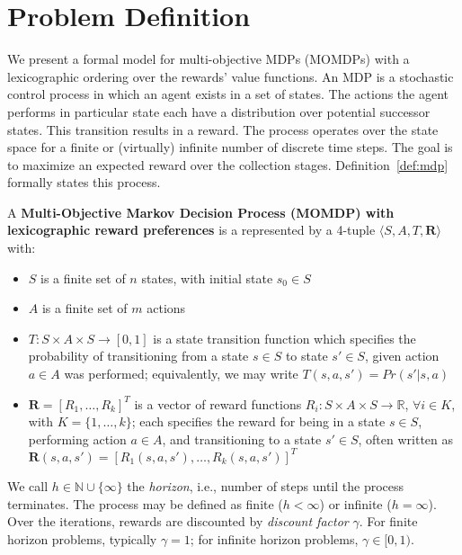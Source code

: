 \section{Problem Definition}
\label{sec:problem_definition}

We present a formal model for multi-objective MDPs (MOMDPs) with a lexicographic ordering over the rewards' value functions. An MDP is a stochastic control process in which an agent exists in a set of states. The actions the agent performs in particular state each have a distribution over potential successor states. This transition results in a reward. The process operates over the state space for a finite or (virtually) infinite number of discrete time steps. The goal is to maximize an expected reward over the collection stages. Definition~\ref{def:mdp} formally states this process.
\begin{definition}
    \label{def:mdp}
    A \textbf{Multi-Objective Markov Decision Process (MOMDP) with lexicographic reward preferences} is a represented by a 4-tuple $\langle S, A, T, \mathbf{R} \rangle$ with:
    \begin{itemize}
        \item $S$ is a finite set of $n$ states, with initial state $s_0 \in S$
        \item $A$ is a finite set of $m$ actions
        \item $T : S \times A \times S \rightarrow [0, 1]$ is a state transition function which specifies the probability of transitioning from a state $s \in S$ to state $s' \in S$, given action $a \in A$ was performed; equivalently, we may write $T(s, a, s') = Pr(s' | s, a)$
        \item $\mathbf{R} = [R_1, \ldots, R_k ]^T$ is a vector of reward functions $R_i : S \times A \times S \rightarrow \mathbb{R}$, $\forall i \in K$, with $K = \{1, \ldots, k\}$; each specifies the reward for being in a state $s \in S$, performing action $a \in A$, and transitioning to a state $s' \in S$, often written as $\mathbf{R}(s, a, s') = [R_1(s, a, s'), \ldots, R_k(s, a, s')]^T$
    \end{itemize}
\end{definition}

We call $h \in \mathbb{N} \cup \{ \infty \}$ the \emph{horizon}, i.e., number of steps until the process terminates. The process may be defined as finite ($h < \infty$) or infinite ($h = \infty$). Over the iterations, rewards are discounted by \emph{discount factor} $\gamma$. For finite horizon problems, typically $\gamma = 1$; for infinite horizon problems, $\gamma \in [0, 1)$.

